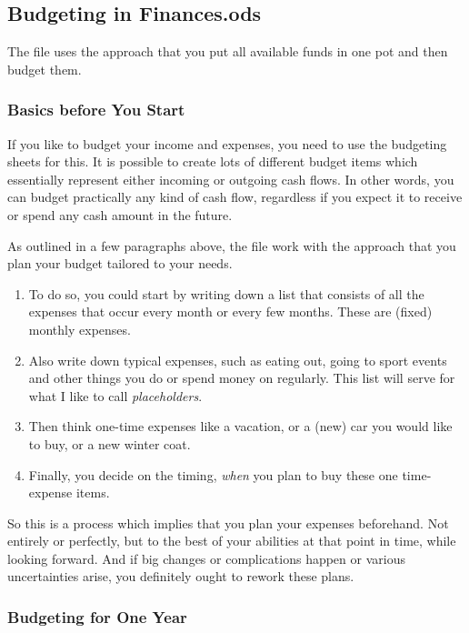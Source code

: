 \subsection{Budgeting in Finances.ods}
\label{subsec:budgeting-in-finances.ods}

The file uses the approach that you put all available funds in one pot and then budget them.

\subsubsection{Basics before You Start}
\label{subsubsec:budgeting-basics}

If you like to budget your income and expenses, you need to use the budgeting sheets for this.
It is possible to create lots of different budget items which essentially represent either incoming or outgoing cash flows.
In other words, you can budget practically any kind of cash flow, regardless if you expect it to receive or spend any cash amount in the future.

As outlined in a few paragraphs above, the file work with the approach that you plan your budget tailored to your needs.
\begin{enumerate}	
	\item To do so, you could start by writing down a list that consists of all the expenses that occur every month or every few months.
	These are (fixed) monthly expenses.
	\item Also write down typical expenses, such as eating out, going to sport events and other things you do or spend money on regularly.
	This list will serve for what I like to call \emph{placeholders}.
	\item Then think one-time expenses like a vacation, or a (new) car you would like to buy, or a new winter coat.
	\item Finally, you decide on the timing, \emph{when} you plan to buy these one time-expense items.
\end{enumerate}

So this is a process which implies that you plan your expenses beforehand.
Not entirely or perfectly, but to the best of your abilities at that point in time, while looking forward.
And if big changes or complications happen or various uncertainties arise, you definitely ought to rework these plans.

\subsubsection{Budgeting for One Year}
\label{subsubsec:budgeting-for-one-year}

